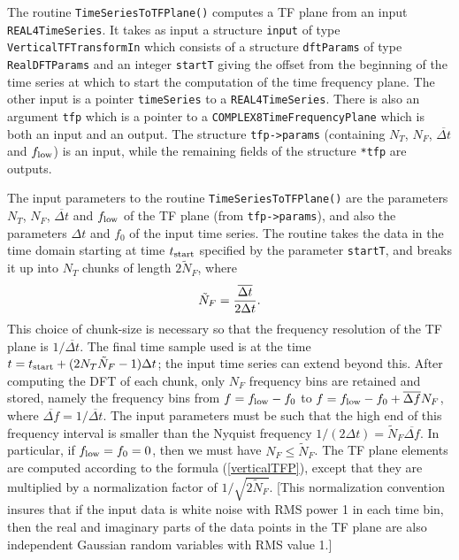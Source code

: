 The routine \verb+TimeSeriesToTFPlane()+ computes a TF plane from an input 
\verb+REAL4TimeSeries+.  It takes as input a structure \verb+input+ of type
\verb+VerticalTFTransformIn+ which consists of a structure \verb+dftParams+ of
type \verb+RealDFTParams+ and an integer \verb+startT+ giving the 
offset from the beginning of the time series at which to start the
computation of the time frequency plane.  The other input is a pointer
\verb+timeSeries+ to a \verb+REAL4TimeSeries+.  There is also an
argument \verb+tfp+ which is a pointer to a
\verb+COMPLEX8TimeFrequencyPlane+ which is both an input and an
output.  The structure \verb+tfp->params+ (containing $N_T$, $N_F$,
${\overline {\Delta t}}$ and $f_{\rm low}$) is an input, while the
remaining fields of the structure \verb+*tfp+ are outputs.

The input parameters to the routine \verb+TimeSeriesToTFPlane()+ are the
parameters $N_T$, $N_F$, ${\overline {\Delta t}}$ and $f_{\rm low}$ of the TF
plane (from \verb+tfp->params+), and also the parameters $\Delta t$ and $f_0$
of the input time series.  The routine takes the data in the time domain
starting at time $t_{\rm start}$ specified by the parameter \verb+startT+, and
breaks it up into $N_T$ chunks of length $2 {\tilde N}_F$, where
\begin{equation}
{\tilde N}_F = { {\overline {\Delta t}} \over 2 \Delta t}.
\end{equation}
This choice of chunk-size is necessary so that the frequency resolution of the
TF plane is $1/{\overline {\Delta t}}$.  The final time sample used is at the
time $t = t_{\rm start} + (2 N_T {\tilde N}_F-1) \Delta t$; the input time
series can extend beyond this.  After computing the DFT of each chunk, only
$N_F$ frequency bins are retained and stored, namely the frequency bins from
$f = f_{\rm low} - f_0$ to $f = f_{\rm low} - f_0 + {\overline {\Delta f}}
N_F$, where ${\overline {\Delta f}} = 1 / {\overline {\Delta t}}$.  The input
parameters must be such that the high end of this  frequency interval is
smaller than the Nyquist frequency $1 / (2 \Delta t) = {\tilde N}_F {\overline
{\Delta f}}$.  In particular, if $f_{\rm low} = f_0 =0$, then we must have
$N_F \le {\tilde N}_F$.  The TF plane elements are computed according to the
formula (\ref{verticalTFP}), except that they are multiplied by a
normalization factor of $1/\sqrt{2 {\tilde N}_F}$.  [This normalization
convention insures that if the input data is white noise with RMS power 1 in
each time bin, then the real and imaginary parts of the data points in the TF
plane are also independent Gaussian random variables with RMS value 1.]  
 
